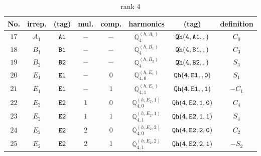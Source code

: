 \documentclass[fleqn,8pt]{jsarticle}
\begin{document}
\begin{table}[ht!]
\begin{center}
\caption{rank 4}
\renewcommand{\arraystretch}{1.3}
\begin{tabular}{cccccccc} \hline \hline
No. & irrep. & (tag) & mul. & comp. & harmonics & (tag) & definition \\ \hline
$ 17 $ & $ A_{1} $ & $ {\tt A1} $ & $ - $ & $ - $ & $ \mathbb{Q}_{4}^{(h,A_{1})} $ & $ {\tt Qh(4,A1,,)} $ & $ C_{0} $ \\
$ 18 $ & $ B_{1} $ & $ {\tt B1} $ & $ - $ & $ - $ & $ \mathbb{Q}_{4}^{(h,B_{1})} $ & $ {\tt Qh(4,B1,,)} $ & $ C_{3} $ \\
$ 19 $ & $ B_{2} $ & $ {\tt B2} $ & $ - $ & $ - $ & $ \mathbb{Q}_{4}^{(h,B_{2})} $ & $ {\tt Qh(4,B2,,)} $ & $ S_{3} $ \\
$ 20 $ & $ E_{1} $ & $ {\tt E1} $ & $ - $ & $ 0 $ & $ \mathbb{Q}_{4,0}^{(h,E_{1})} $ & $ {\tt Qh(4,E1,,0)} $ & $ S_{1} $ \\
$ 21 $ & $ E_{1} $ & $ {\tt E1} $ & $ - $ & $ 1 $ & $ \mathbb{Q}_{4,1}^{(h,E_{1})} $ & $ {\tt Qh(4,E1,,1)} $ & $ - C_{1} $ \\
$ 22 $ & $ E_{2} $ & $ {\tt E2} $ & $ 1 $ & $ 0 $ & $ \mathbb{Q}_{4,0}^{(h,E_{2},1)} $ & $ {\tt Qh(4,E2,1,0)} $ & $ C_{4} $ \\
$ 23 $ & $ E_{2} $ & $ {\tt E2} $ & $ 1 $ & $ 1 $ & $ \mathbb{Q}_{4,1}^{(h,E_{2},1)} $ & $ {\tt Qh(4,E2,1,1)} $ & $ S_{4} $ \\
$ 24 $ & $ E_{2} $ & $ {\tt E2} $ & $ 2 $ & $ 0 $ & $ \mathbb{Q}_{4,0}^{(h,E_{2},2)} $ & $ {\tt Qh(4,E2,2,0)} $ & $ C_{2} $ \\
$ 25 $ & $ E_{2} $ & $ {\tt E2} $ & $ 2 $ & $ 1 $ & $ \mathbb{Q}_{4,1}^{(h,E_{2},2)} $ & $ {\tt Qh(4,E2,2,1)} $ & $ - S_{2} $ \\
 \hline \hline
\end{tabular}
\end{center}
\end{table}
\end{document}
